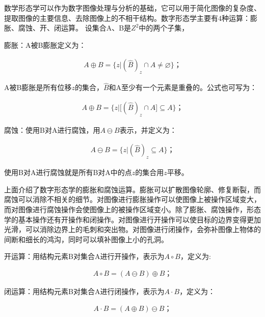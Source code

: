 	


         
数学形态学可以作为数字图像处理与分析的基础，它可以用于简化图像的复杂度、提取图像的主要信息、去除图像上的不相干结构。数字形态学主要有4种运算：膨胀、腐蚀、开、闭运算。 设集合A、B是$Z^{2}$中的两个子集，

膨胀：A被B膨胀定义为： 
\begin{linenomath}
\begin{align}
 A \oplus B=\{z | {(\widehat{B})}_{z} \cap A \neq  \varnothing \}；
\label{式4_4}
\end{align}
\end{linenomath}

A被B膨胀是所有位移$z$的集合，$\widehat{B}$和A至少有一个元素是重叠的。公式也可写为：
\begin{linenomath}
\begin{align}
A \oplus B=\{z | {[(\widehat{B})}_{z} \cap A]  \subseteq  A \}；
\label{式4_5}
\end{align}
\end{linenomath}   
       
腐蚀：使用B对A进行腐蚀，用$A\ominus B$表示，并定义为：
\begin{linenomath}
\begin{align}
A \ominus B=\{z | {(\widehat{B})}_{z}  \subseteq  A \}；
\label{式4_6}
\end{align}
\end{linenomath}

使用B对A进行腐蚀就是所有B对A中的点$z$的集合用$z$平移。
        
上面介绍了数字形态学的膨胀和腐蚀运算。膨胀可以扩散图像轮廓、修复断裂，而腐蚀可以消除不相关的细节。对图像进行膨胀操作可以使图像上被操作区域变大，而对图像进行腐蚀操作会使图像上的被操作区域变小。除了膨胀、腐蚀操作，形态学的基本操作还有开操作和闭操作。对图像进行开操作可以使目标的边界变得更加光滑，可以消除边界上的毛刺和突出物。对图像进行闭操作，会弥补图像上物体的间断和细长的鸿沟，同时可以填补图像上小的孔洞。
                
开运算：用结构元素B对集合A进行开操作，表示为$A \circ B$，定义为:
\begin{linenomath}
\begin{align}
 A \circ B=(A \ominus B) \oplus B；
\label{式4_7}
\end{align}
\end{linenomath}

         
闭运算：用结构元素B对集合A进行闭操作，表示为$A \cdot B$，定义为：
\begin{linenomath}
\begin{align}
A \cdot B=(A \oplus B)  \ominus B；
\label{式4_8}
\end{align}
\end{linenomath}
           
